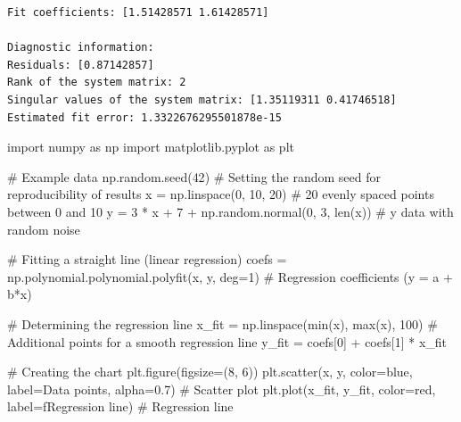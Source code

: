 \documentclass[
  english,
  letterpaper,
  DIV=11,
  numbers=noendperiod]{scrreprt}
\newenvironment{Shaded}{\begin{snugshade}}{\end{snugshade}}
\newcommand{\BuiltInTok}[1]{\textcolor[rgb]{0.00,0.23,0.31}{#1}}
\newcommand{\CommentTok}[1]{\textcolor[rgb]{0.37,0.37,0.37}{#1}}
\newcommand{\DecValTok}[1]{\textcolor[rgb]{0.68,0.00,0.00}{#1}}
\newcommand{\FloatTok}[1]{\textcolor[rgb]{0.68,0.00,0.00}{#1}}
\newcommand{\ImportTok}[1]{\textcolor[rgb]{0.00,0.46,0.62}{#1}}
\newcommand{\NormalTok}[1]{\textcolor[rgb]{0.00,0.23,0.31}{#1}}
\newcommand{\OperatorTok}[1]{\textcolor[rgb]{0.37,0.37,0.37}{#1}}
\newcommand{\SpecialStringTok}[1]{\textcolor[rgb]{0.13,0.47,0.30}{#1}}
\newcommand{\StringTok}[1]{\textcolor[rgb]{0.13,0.47,0.30}{#1}}
\begin{document}
\begin{verbatim}
Fit coefficients: [1.51428571 1.61428571]

Diagnostic information:
Residuals: [0.87142857]
Rank of the system matrix: 2
Singular values of the system matrix: [1.35119311 0.41746518]
Estimated fit error: 1.3322676295501878e-15
\end{verbatim}

\begin{Shaded}
\begin{Highlighting}[]
\ImportTok{import}\NormalTok{ numpy }\ImportTok{as}\NormalTok{ np}
\ImportTok{import}\NormalTok{ matplotlib.pyplot }\ImportTok{as}\NormalTok{ plt}

\CommentTok{\# Example data}
\NormalTok{np.random.seed(}\DecValTok{42}\NormalTok{)  }\CommentTok{\# Setting the random seed for reproducibility of results}
\NormalTok{x }\OperatorTok{=}\NormalTok{ np.linspace(}\DecValTok{0}\NormalTok{, }\DecValTok{10}\NormalTok{, }\DecValTok{20}\NormalTok{)  }\CommentTok{\# 20 evenly spaced points between 0 and 10}
\NormalTok{y }\OperatorTok{=} \DecValTok{3} \OperatorTok{*}\NormalTok{ x }\OperatorTok{+} \DecValTok{7} \OperatorTok{+}\NormalTok{ np.random.normal(}\DecValTok{0}\NormalTok{, }\DecValTok{3}\NormalTok{, }\BuiltInTok{len}\NormalTok{(x))  }\CommentTok{\# y data with random noise}

\CommentTok{\# Fitting a straight line (linear regression)}
\NormalTok{coefs }\OperatorTok{=}\NormalTok{ np.polynomial.polynomial.polyfit(x, y, deg}\OperatorTok{=}\DecValTok{1}\NormalTok{)  }\CommentTok{\# Regression coefficients (y = a + b*x)}

\CommentTok{\# Determining the regression line}
\NormalTok{x\_fit }\OperatorTok{=}\NormalTok{ np.linspace(}\BuiltInTok{min}\NormalTok{(x), }\BuiltInTok{max}\NormalTok{(x), }\DecValTok{100}\NormalTok{)  }\CommentTok{\# Additional points for a smooth regression line}
\NormalTok{y\_fit }\OperatorTok{=}\NormalTok{ coefs[}\DecValTok{0}\NormalTok{] }\OperatorTok{+}\NormalTok{ coefs[}\DecValTok{1}\NormalTok{] }\OperatorTok{*}\NormalTok{ x\_fit}

\CommentTok{\# Creating the chart}
\NormalTok{plt.figure(figsize}\OperatorTok{=}\NormalTok{(}\DecValTok{8}\NormalTok{, }\DecValTok{6}\NormalTok{))}
\NormalTok{plt.scatter(x, y, color}\OperatorTok{=}\StringTok{\textquotesingle{}blue\textquotesingle{}}\NormalTok{, label}\OperatorTok{=}\StringTok{\textquotesingle{}Data points\textquotesingle{}}\NormalTok{, alpha}\OperatorTok{=}\FloatTok{0.7}\NormalTok{)  }\CommentTok{\# Scatter plot}
\NormalTok{plt.plot(x\_fit, y\_fit, color}\OperatorTok{=}\StringTok{\textquotesingle{}red\textquotesingle{}}\NormalTok{, label}\OperatorTok{=}\SpecialStringTok{f\textquotesingle{}Regression line\textquotesingle{}}\NormalTok{)  }\CommentTok{\# Regression line}


\end{Highlighting}
\end{Shaded}
\end{document}
